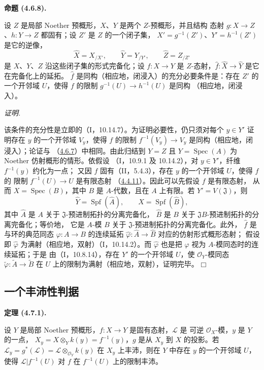 \documentclass[UTF8,fontset=none,11pt,oneside,openany]{ctexbook}
\providecommand{\square}{\mdlgwhtsquare}
\newenvironment{theorem}[1][]{%
  \par\medskip\noindent\textbf{定理 (#1).}\ %
}{\par}
\newenvironment{proposition}[1][]{%
  \par\medskip\noindent\textbf{命题 (#1).}\ %
}{\par}
\newenvironment{proof}{%
  \par\smallskip\noindent\textit{证明.}\ %
}{\hfill$\square$\par}
\newcommand{\oldpage}[2][]{%
  \hypertarget{ega-source-page-#1-#2}{}%
  \marginnote{\scriptsize\textbf{#1}~|~#2}\ignorespaces}
\let\EGAOriginalLabel\label
\renewcommand{\label}[1]{\phantomsection\EGAOriginalLabel{#1}}
\begin{document}
\begin{proposition}[4.6.8]
\label{III.4.6.8-fr}
设 $Z$ 是局部 Noether 预概形，$X$、$Y$ 是两个 $Z$-预概形，并且结构
态射 $g:X\to Z$、$h:Y\to Z$ 都固有；设 $Z'$ 是 $Z$ 的一个闭子集，
$X'=g^{-1}(Z')$、$Y'=h^{-1}(Z')$ 是它的逆像，
\[
\widehat X=X_{/X'},\qquad
\widehat Y=Y_{/Y'},\qquad
\widehat Z=Z_{/Z'}
\]
是 $X$、$Y$、$Z$ 沿这些闭子集的形式完备化；设 $f:X\to Y$ 是
$Z$-态射，$\widehat f:\widehat X\to\widehat Y$ 是它在完备化上的延拓。
$\widehat f$ 是同构（相应地，闭浸入）的充分必要条件是：存在 $Z'$ 的
一个开邻域 $U$，使得 $f$ 的限制 $g^{-1}(U)\to h^{-1}(U)$ 是同构
（相应地，闭浸入）。
\end{proposition}

\begin{proof}
该条件的充分性是立即的（I，10.14.7）。为证明必要性，仍只须对每个
$y\in Y'$ 证明存在 $y$ 的一个开邻域 $V_y$，使得 $f$ 的限制
$f^{-1}(V_y)\to V_y$ 是同构（相应地，闭浸入）；论证与
（\hyperref[III.4.6.7-fr]{4.6.7}）中相同。由此归结到 $Y=Z$ 且
$Y=\operatorname{Spec}(A)$ 为 Noether 仿射概形的情形。依假设
（I，10.9.1 及 10.14.2），对 $y\in Y'$，纤维 $f^{-1}(y)$ 约化为一点；
又因 $f$ 固有（II，5.4.3），存在 $y$ 的一个开邻域 $U$，使得 $f$ 的
限制 $f^{-1}(U)\to U$ 是有限态射
（\hyperref[III.4.4.11-fr]{4.4.11}）。因此可以先假设 $f$ 是有限态射，
从而 $X=\operatorname{Spec}(B)$，其中 $B$ 是 $A$-代数，且在 $A$ 上有限。若
$Y'=V(\mathfrak J)$，则
\[
\widehat Y=\operatorname{Spf}(\widehat A),\qquad
\widehat X=\operatorname{Spf}(\widehat B),
\]
其中 $\widehat A$ 是 $A$ 关于 $\mathfrak J$-预进制拓扑的分离完备化，
$\widehat B$ 是 $B$ 关于 $\mathfrak JB$-预进制拓扑的分离完备化；等价地，
它是 $A$-模 $B$ 关于 $\mathfrak J$-预进制拓扑的分离完备化。此外，
$\widehat f$ 是与环的典范同态 $\varphi:A\to B$ 的连续延拓
$\widehat\varphi:\widehat A\to\widehat B$ 对应的仿射形式概形态射；
假设即 $\widehat\varphi$ 为满射（相应地，双射）（I，10.14.2）。而
$\widehat\varphi$ 也是把 $\varphi$ 视为 $A$-模同态时的连续延拓；于是
由（I，10.8.14），存在 $Y'$ 的一个开邻域 $U$，使
$\mathcal O_Y$-模同态 $\widetilde\varphi:\widetilde A\to\widetilde B$ 在
$U$ 上的限制为满射（相应地，双射），证明完毕。
\end{proof}

\oldpage[III]{145}

\subsection{一个丰沛性判据}

\begin{theorem}[4.7.1]
\label{III.4.7.1-fr}
设 $Y$ 是局部 Noether 预概形，$f:X\to Y$ 是固有态射，$\mathcal L$ 是
可逆 $\mathcal O_X$-模，$y$ 是 $Y$ 的一点，
$X_y=X\otimes_Yk(y)=f^{-1}(y)$，$g$ 是从 $X_y$ 到 $X$ 的投影。若
$\mathcal L_y=g^*(\mathcal L)=\mathcal L\otimes_{\mathcal O_Y}k(y)$ 在
$X_y$ 上丰沛，则在 $Y$ 中存在 $y$ 的一个开邻域 $U$，使得
$\mathcal L|f^{-1}(U)$ 对 $f$ 在 $f^{-1}(U)$ 上的限制丰沛。
\end{theorem}
\end{document}
